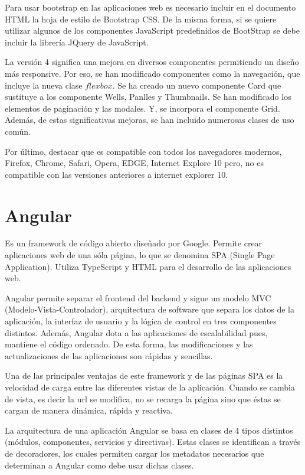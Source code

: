 \documentclass[a4paper, 12pt]{book}
\begin{document}
Para usar bootstrap en las aplicaciones web es necesario incluir en el documento HTML la hoja de estilo de Bootstrap CSS. De la misma forma, si se quiere utilizar algunos de los componentes JavaScript predefinidos de BootStrap se debe incluir la librería JQuery de JavaScript. 

La versión 4 significa una mejora en diversos componentes permitiendo un diseño más responsive. Por eso, se han modificado componentes como la navegación, que incluye la nueva clase $flexbox$. Se ha creado un nuevo componente Card que sustituye a los componente Wells, Panlles y Thumbnails. Se han modificado los elementos de paginación y las modales. Y, se incorpora el componente Grid. Además, de estas significativas mejoras, se han incluido numerosas clases de uso común. 

Por último, destacar que es compatible con todos los navegadores modernos, Firefox, Chrome, Safari, Opera, EDGE, Internet Explore 10 pero, no es compatible con las versiones anteriores a internet explorer 10.



\section{Angular} 
\label{sec:Angular}

Es un framework de código abierto diseñado por Google. Permite crear aplicaciones web de una sóla página, lo que se denomina SPA (Single Page Application). Utiliza TypeScript y HTML para el desarrollo de las aplicaciones web. 

Angular permite separar el frontend del backend y sigue un modelo MVC (Modelo-Vista-Controlador), arquitectura de software que separa los datos de la aplicación, la interfaz de usuario y la lógica de control en tres componentes distintos. Además, Angular dota a las aplicaciones de escalabilidad pues, mantiene el código ordenado. De esta forma, las modificaciones y las actualizaciones de las aplicaciones son rápidas y sencillas. 

Una de las principales ventajas de este framework y de las páginas SPA es la velocidad de carga entre las diferentes vistas de la aplicación. Cuando se cambia de vista, es decir la url se modifica, no se recarga la página sino que éstas se cargan de manera dinámica, rápida y reactiva. 

La arquitectura de una aplicación Angular se basa en clases de 4 tipos distintos (módulos, componentes, servicios y directivas). Estas clases se identifican a través de decoradores, los cuales permiten cargar los metadatos necesarios que determinan a Angular como debe usar dichas clases. 
\end{document}
